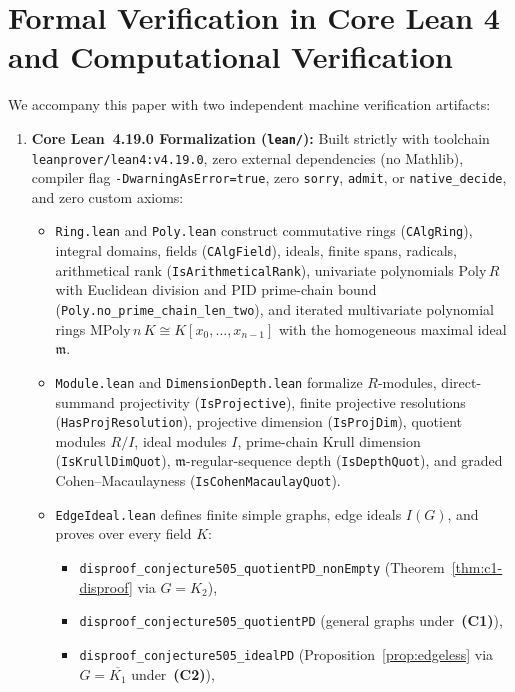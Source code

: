 \documentclass[11pt,a4paper]{amsart}
\theoremstyle{plain}
\theoremstyle{definition}
\newcommand{\mm}{\mathfrak{m}}
\begin{document}
\section{Formal Verification in Core Lean 4 and Computational Verification}\label{sec:lean}

{\sloppy
We accompany this paper with two independent machine verification artifacts:

\begin{enumerate}
  \item[(1)] \textbf{Core Lean~4.19.0 Formalization (\texttt{lean/}):} Built strictly with toolchain \texttt{leanprover/lean4:v4.19.0}, zero external dependencies (no Mathlib), compiler flag \texttt{-DwarningAsError=true}, zero \texttt{sorry}, \texttt{admit}, or \texttt{native\_decide}, and zero custom axioms:
  \begin{itemize}
    \item \texttt{Ring.lean} and \texttt{Poly.lean} construct commutative rings (\texttt{CAlgRing}), integral domains, fields (\texttt{CAlgField}), ideals, finite spans, radicals, arithmetical rank (\texttt{IsArithmeticalRank}), univariate polynomials $\mathrm{Poly}\,R$ with Euclidean division and PID prime-chain bound (\texttt{Poly.no\_prime\_chain\_len\_two}), and iterated multivariate polynomial rings $\mathrm{MPoly}\,n\,K \cong K[x_0,\dots,x_{n-1}]$ with the homogeneous maximal ideal $\mm$.
    \item \texttt{Module.lean} and \texttt{DimensionDepth.lean} formalize $R$-modules, direct-summand projectivity (\texttt{IsProjective}), finite projective resolutions (\texttt{HasProjResolution}), projective dimension (\texttt{IsProjDim}), quotient modules $R/I$, ideal modules $I$, prime-chain Krull dimension (\texttt{IsKrullDimQuot}), $\mm$-regular-sequence depth (\texttt{IsDepthQuot}), and graded Cohen--Macaulayness (\texttt{IsCohenMacaulayQuot}).
    \item \texttt{EdgeIdeal.lean} defines finite simple graphs, edge ideals $I(G)$, and proves over every field $K$:
    \begin{itemize}
      \item \texttt{disproof\_conjecture505\_quotientPD\_nonEmpty} (Theorem~\ref{thm:c1-disproof} via $G = K_2$),
      \item \texttt{disproof\_conjecture505\_quotientPD} (general graphs under~\textbf{(C1)}),
      \item \texttt{disproof\_conjecture505\_idealPD} (Proposition~\ref{prop:edgeless} via $G = \overline{K_1}$ under~\textbf{(C2)}),

\end{itemize}
\end{itemize}
\end{enumerate}}
\end{document}
